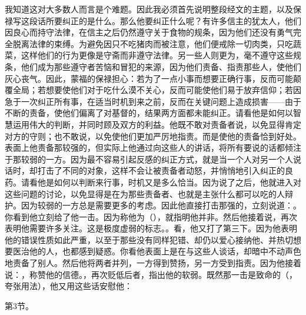 我知道这对大多数人而言是个难题。因此我必须首先说明整段经文的主题，以及保禄写这段话所要纠正的是什么。那么他要纠正什么呢？有许多信主的犹太人，他们因良心而持守法律，在信主之后仍然遵守关于食物的规条，因为他们还没有勇气完全脱离法律的束缚。为避免因只不吃猪肉而被注意，他们便戒除一切肉类，只吃蔬菜，这样他们的行为更像是守斋而非遵守法律。另一些人则更为，毫不遵守这些规条，他们成为那些遵守者苦恼和冒犯的来源，因为他们责备、指责那些人，使他们灰心丧气。因此，蒙福的保禄担心：若为了一点小事而想要正确行事，反而可能颠覆全局；若想要使他们对于吃什么漠不关心，反而可能使他们易于放弃信仰；若因急于一次纠正所有事，在适当时机到来之前，反而在关键问题上造成损害——由于不断的责备，使他们偏离了对基督的，结果两方面都未能纠正。请看他是如何以智慧运用伟大的判断，并同时顾及双方的利益。他既不敢对责备者说，以免显得肯定对方的守则；也不敢说，以免使他们更加严厉地指责。而是使他的责备恰到好处。表面上他责备那较强的，但实际上他通过向这些人的讲话，将所有要说的话都倾注于那较弱的一方。因为最不容易引起反感的纠正方式，就是当一个人对另一个人说话时，却打击了不同的对象，这样不会让被责备者动怒，并悄悄地引入纠正的良药。请看他是如何以判断来行事，时机又是多么恰当。因为说了之后，他就进入对这些问题的讨论，以免显得是在为那些责备者、也就是主张什么都可以吃的人辩护。因为较弱的一方总是需要更多的考虑。因此他直接打击那强的，立刻说道：。你看到他立刻给了他一击。因为称他为（），就指明他并非。然后他接着说，再次表明他需要许多关注。这是极度虚弱的标志。。看，他又打了第三下。因为他表明他的错误性质如此严重，以至于那些没有同样犯错、却仍以爱心接纳他、并热切想要医治他的人，也都感到疑惑。你看他表面上是在与这些人谈话，却暗中不动声色地责备了别人。然后他将两者并列，一方得到赞扬，另一方受到指责。因为他接着说：，称赞他的信德。，再次贬低后者，指出他的软弱。既然那一击是致命的（，夸张用法），他又用这些话安慰他：\par

第3节。\par

